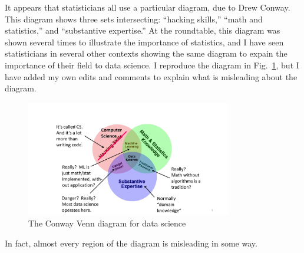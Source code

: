 \documentclass[11pt]{article}
\begin{document}
It appears that statisticians all use a particular diagram, due to Drew Conway.  This diagram shows three sets intersecting: ``hacking skills,'' ``math and statistics,'' and ``substantive expertise.''  At the roundtable, this diagram was shown several times to illustrate the importance of statistics, and I have seen statisticians in several other contexts showing the same diagram to expain the importance of their field to data science.  I reproduce the diagram in Fig.~\ref{drew-diagram-fig}, but I have added my own edits and comments to explain what is misleading about the diagram.

\begin{figure}[h]
\centerline{\includegraphics[width=0.8\textwidth]{letters/drew-diagram.pdf}}
\caption{The Conway Venn diagram for data science}
\label{drew-diagram-fig}
\end{figure}

In fact, almost every region of the diagram is misleading in some way.
\end{document}
